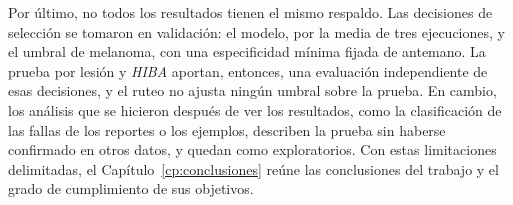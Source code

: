 Por último, no todos los resultados tienen el mismo respaldo. Las decisiones de selección se tomaron en validación: el
modelo, por la media de tres ejecuciones, y el umbral de melanoma, con una especificidad mínima fijada de antemano. La
prueba por lesión y \emph{HIBA} aportan, entonces, una evaluación independiente de esas decisiones, y el ruteo no
ajusta ningún umbral sobre la prueba. En cambio, los análisis que se hicieron después de ver los resultados, como la
clasificación de las fallas de los reportes o los ejemplos, describen la prueba sin haberse confirmado en otros datos, y
quedan como exploratorios. Con estas limitaciones delimitadas, el Capítulo~\ref{cp:conclusiones} reúne las conclusiones
del trabajo y el grado de cumplimiento de sus objetivos.
